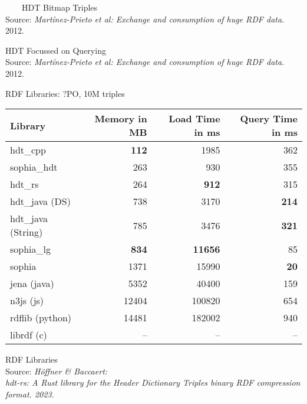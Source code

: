 \documentclass[14pt,aspectratio=169]{beamer}
\newcommand{\imageslide}[4][]
{
\begin{frame}[plain]{~~~~#2}
\vspace{0.2em}
\centering\makebox[\linewidth]{\texttt{[image: \#3]}}
\\#1
\note{#4}
\end{frame}
}
\begin{document}

\imageslide[\footnotesize Source: \emph{Martínez-Prieto et al: Exchange and consumption of huge RDF data.} 2012.]{HDT Bitmap Triples}{img/bt.png}{}

\begin{frame}[plain]{HDT Focussed on Querying}
\centering
{}\\
\footnotesize Source: \emph{Martínez-Prieto et al: Exchange and consumption of huge RDF data.} 2012.
\end{frame}

\begin{frame}[fragile]{RDF Libraries: ?PO, 10M triples}
\centering
\small
\begin{tabular}{lrrr}
\toprule
Library & Memory in MB & Load Time in ms & Query Time in ms \\
\midrule
hdt\_cpp & \textbf{112} & 1985 & 362 \\
sophia\_hdt & 263 & 930 & 355 \\
hdt\_rs & 264 & \textbf{912} & 315 \\
hdt\_java (DS) & 738 & 3170 & \textbf{214} \\
hdt\_java (String) & 785 & 3476 & \textbf{321} \\
\midrule
sophia\_lg & \textbf{834} & \textbf{11656} & 85 \\
sophia & 1371 & 15990 & \textbf{20} \\
jena (java) & 5352 & 40400 & 159 \\
n3js (js) & 12404 & 100820 & 654 \\
rdflib (python) & 14481 & 182002 & 940 \\
librdf (c) & -- & -- & -- \\
\bottomrule
\end{tabular}
\end{frame}


\begin{frame}[plain]{RDF Libraries}
\centering
{}\\
\scriptsize Source: \emph{Höffner \& Baccaert:\\hdt-rs: A Rust library for the Header Dictionary Triples binary RDF compression format. 2023.}
\end{frame}
\end{document}
